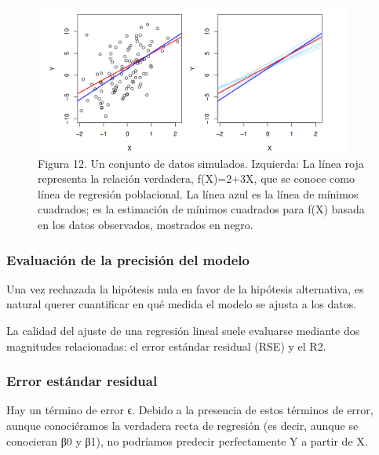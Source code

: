 \documentclass[
  letterpaper,
  DIV=11,
  numbers=noendperiod]{scrartcl}
\begin{document}
\begin{figure}

{\centering \includegraphics[width=4.11458in,height=\textheight]{images/figura12.png}

}

\caption{Figura 12. Un conjunto de datos simulados. Izquierda: La línea
roja representa la relación verdadera, f(X)=2+3X, que se conoce como
línea de regresión poblacional. La línea azul es la línea de mínimos
cuadrados; es la estimación de mínimos cuadrados para f(X) basada en los
datos observados, mostrados en negro.}

\end{figure}

\hypertarget{evaluaciuxf3n-de-la-precisiuxf3n-del-modelo}{%
\subsubsection{\texorpdfstring{\textbf{Evaluación de la precisión del
modelo}}{Evaluación de la precisión del modelo}}\label{evaluaciuxf3n-de-la-precisiuxf3n-del-modelo}}

Una vez rechazada la hipótesis nula en favor de la hipótesis
alternativa, es natural querer cuantificar en qué medida el modelo se
ajusta a los datos.

La calidad del ajuste de una regresión lineal suele evaluarse mediante
dos magnitudes relacionadas: el error estándar residual (RSE) y el R2.

\hypertarget{error-estuxe1ndar-residual}{%
\subsubsection{\texorpdfstring{\textbf{Error estándar
residual}}{Error estándar residual}}\label{error-estuxe1ndar-residual}}

Hay un término de error ϵ. Debido a la presencia de estos términos de
error, aunque conociéramos la verdadera recta de regresión (es decir,
aunque se conocieran β0 y β1), no podríamos predecir perfectamente Y a
partir de X.
\end{document}

